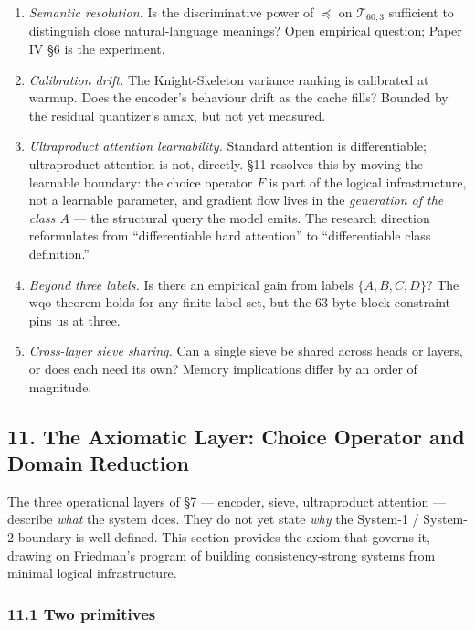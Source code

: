 \documentclass[
  11pt,
]{article}
\begin{document}
\begin{enumerate}
\def\labelenumi{\arabic{enumi}.}
\item
  \emph{Semantic resolution.} Is the discriminative power of \(\preceq\)
  on \(\mathcal{T}_{60,3}\) sufficient to distinguish close
  natural-language meanings? Open empirical question; Paper IV §6 is the
  experiment.
\item
  \emph{Calibration drift.} The Knight-Skeleton variance ranking is
  calibrated at warmup. Does the encoder's behaviour drift as the cache
  fills? Bounded by the residual quantizer's amax, but not yet measured.
\item
  \emph{Ultraproduct attention learnability.} Standard attention is
  differentiable; ultraproduct attention is not, directly. §11 resolves
  this by moving the learnable boundary: the choice operator \(F\) is
  part of the logical infrastructure, not a learnable parameter, and
  gradient flow lives in the \emph{generation of the class \(A\)} ---
  the structural query the model emits. The research direction
  reformulates from ``differentiable hard attention'' to
  ``differentiable class definition.''
\item
  \emph{Beyond three labels.} Is there an empirical gain from labels
  \(\{A, B, C, D\}\)? The wqo theorem holds for any finite label set,
  but the 63-byte block constraint pins us at three.
\item
  \emph{Cross-layer sieve sharing.} Can a single sieve be shared across
  heads or layers, or does each need its own? Memory implications differ
  by an order of magnitude.
\end{enumerate}

\hypertarget{the-axiomatic-layer-choice-operator-and-domain-reduction}{%
\subsection{11. The Axiomatic Layer: Choice Operator and Domain
Reduction}\label{the-axiomatic-layer-choice-operator-and-domain-reduction}}

The three operational layers of §7 --- encoder, sieve, ultraproduct
attention --- describe \emph{what} the system does. They do not yet
state \emph{why} the System-1 / System-2 boundary is well-defined. This
section provides the axiom that governs it, drawing on Friedman's
program of building consistency-strong systems from minimal logical
infrastructure.

\hypertarget{two-primitives}{%
\subsubsection{11.1 Two primitives}\label{two-primitives}}
\end{document}
